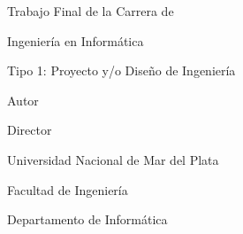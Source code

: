 \begin{titlepage}
\centering
{\LARGE Trabajo Final de la Carrera de\par Ingeniería en Informática\par}
\bigskip
{\large Tipo 1: Proyecto y/o Diseño de Ingeniería\par}
\vfill
{\LARGE\bfseries{} \tituloTrabajo\par}
\vfill
{\large\bfseries \autorTrabajo\par}
Autor\par
\vfill
{\large\bfseries \directorTrabajo\par}
Director\par
\vfill
\fechaDefensa\par
\vfill
{\large Universidad Nacional de Mar del Plata\par}
{\large Facultad de Ingeniería\par}
{\large Departamento de Informática\par}
\end{titlepage}
